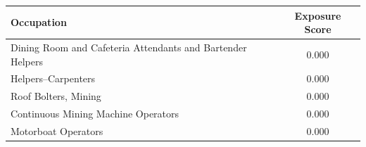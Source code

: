 \begin{tabular}{lc}
\hline
Occupation & Exposure Score \\
\hline
Dining Room and Cafeteria Attendants and Bartender Helpers&0.000\\
Helpers--Carpenters&0.000\\
Roof Bolters, Mining&0.000\\
Continuous Mining Machine Operators&0.000\\
Motorboat Operators&0.000\\
\hline
\end{tabular}

